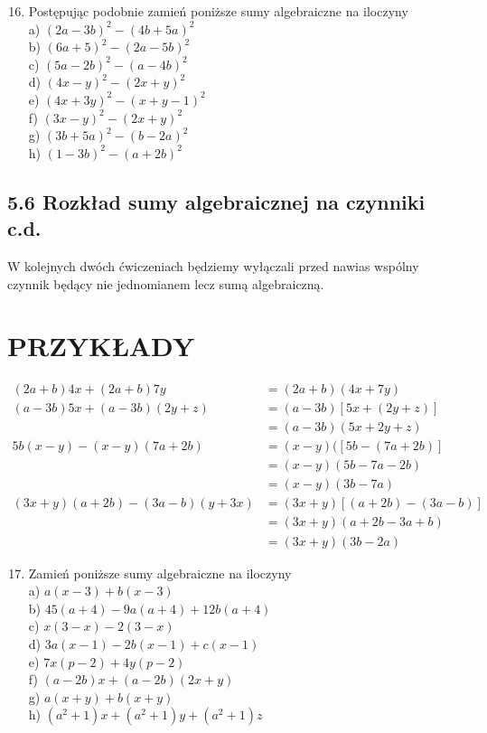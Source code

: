 \documentclass[10pt]{article}
\begin{document}
\begin{enumerate}
  \setcounter{enumi}{15}
  \item Postępując podobnie zamień poniższe sumy algebraiczne na iloczyny\\
a) \((2 a-3 b)^{2}-(4 b+5 a)^{2}\)\\
b) \((6 a+5)^{2}-(2 a-5 b)^{2}\)\\
c) \((5 a-2 b)^{2}-(a-4 b)^{2}\)\\
d) \((4 x-y)^{2}-(2 x+y)^{2}\)\\
e) \((4 x+3 y)^{2}-(x+y-1)^{2}\)\\
f) \((3 x-y)^{2}-(2 x+y)^{2}\)\\
g) \((3 b+5 a)^{2}-(b-2 a)^{2}\)\\
h) \((1-3 b)^{2}-(a+2 b)^{2}\)
\end{enumerate}

\subsection*{5.6 Rozkład sumy algebraicznej na czynniki c.d.}
W kolejnych dwóch ćwiczeniach będziemy wyłączali przed nawias wspólny czynnik będący nie jednomianem lecz sumą algebraiczną.

\section*{PRZYKŁADY}
\[
\begin{aligned}
(2 a+b) 4 x+(2 a+b) 7 y & =(2 a+b)(4 x+7 y) \\
(a-3 b) 5 x+(a-3 b)(2 y+z) & =(a-3 b)[5 x+(2 y+z)] \\
& =(a-3 b)(5 x+2 y+z) \\
5 b(x-y)-(x-y)(7 a+2 b) & =(x-y)([5 b-(7 a+2 b)] \\
& =(x-y)(5 b-7 a-2 b) \\
& =(x-y)(3 b-7 a) \\
(3 x+y)(a+2 b)-(3 a-b)(y+3 x) & =(3 x+y)[(a+2 b)-(3 a-b)] \\
& =(3 x+y)(a+2 b-3 a+b) \\
& =(3 x+y)(3 b-2 a)
\end{aligned}
\]

\begin{enumerate}
  \setcounter{enumi}{16}
  \item Zamień poniższe sumy algebraiczne na iloczyny\\
a) \(a(x-3)+b(x-3)\)\\
b) \(45(a+4)-9 a(a+4)+12 b(a+4)\)\\
c) \(x(3-x)-2(3-x)\)\\
d) \(3 a(x-1)-2 b(x-1)+c(x-1)\)\\
e) \(7 x(p-2)+4 y(p-2)\)\\
f) \((a-2 b) x+(a-2 b)(2 x+y)\)\\
g) \(a(x+y)+b(x+y)\)\\
h) \(\left(a^{2}+1\right) x+\left(a^{2}+1\right) y+\left(a^{2}+1\right) z\)
\end{enumerate}
\end{document}
